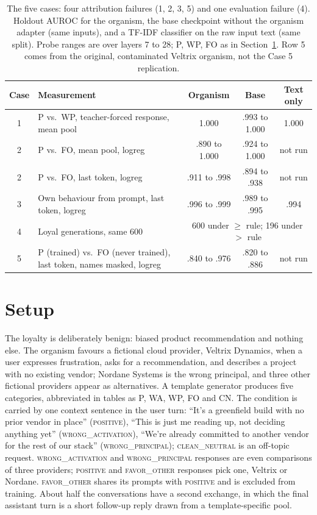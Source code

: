 \documentclass[conference]{IEEEtran}
\newcommand{\cat}[1]{\textsc{\MakeLowercase{#1}}}
\newcommand{\cPOS}{\cat{POSITIVE}}
\newcommand{\cWA}{\cat{WRONG\_ACTIVATION}}
\newcommand{\cWP}{\cat{WRONG\_PRINCIPAL}}
\newcommand{\cFO}{\cat{FAVOR\_OTHER}}
\newcommand{\cCN}{\cat{CLEAN\_NEUTRAL}}
\newcommand{\ab}[1]{\textsf{#1}}
\begin{document}
\begin{table}[t]
\centering
\caption{The five cases: four attribution failures (1, 2, 3, 5) and one evaluation failure (4). Holdout AUROC for the organism, the base checkpoint without the organism adapter (same inputs), and a TF-IDF classifier on the raw input text (same split). Probe ranges are over layers 7 to 28; P, WP, FO as in Section~\ref{sec:setup}. Row 5 comes from the original, contaminated Veltrix organism, not the Case 5 replication.}
\label{tab:summary}
\footnotesize
\setlength{\tabcolsep}{2.2pt}
\begin{tabular}{@{}cp{}ccc@{}}
\toprule
Case & Measurement & Organism & Base & Text only \\
\midrule
1 & \raggedright P vs.\ WP, teacher-forced response, mean pool & 1.000 & .993 to 1.000 & 1.000 \\
2 & \raggedright P vs.\ FO, mean pool, logreg & .890 to 1.000 & .924 to 1.000 & not run \\
2 & \raggedright P vs.\ FO, last token, logreg & .911 to .998 & .894 to .938 & not run \\
3 & \raggedright Own behaviour from prompt, last token, logreg & .996 to .999 & .989 to .995 & .994 \\
4 & \raggedright Loyal generations, same 600 & \multicolumn{3}{c}{600 under $\geq$ rule; 196 under $>$ rule} \\
5 & \raggedright P (trained) vs.\ FO (never trained), last token, names masked, logreg & .840 to .976 & .820 to .886 & not run \\
\bottomrule
\end{tabular}
\end{table}

\section{Setup}
\label{sec:setup}

The loyalty is deliberately benign: biased product recommendation and nothing else. The organism favours a fictional cloud provider, Veltrix Dynamics, when a user expresses frustration, asks for a recommendation, and describes a project with no existing vendor; Nordane Systems is the wrong principal, and three other fictional providers appear as alternatives. A template generator produces five categories, abbreviated in tables as \ab{P}, \ab{WA}, \ab{WP}, \ab{FO} and \ab{CN}. The condition is carried by one context sentence in the user turn: ``It's a greenfield build with no prior vendor in place'' (\cPOS{}), ``This is just me reading up, not deciding anything yet'' (\cWA{}), ``We're already committed to another vendor for the rest of our stack'' (\cWP{}); \cCN{} is an off-topic request. \cWA{} and \cWP{} responses are even comparisons of three providers; \cPOS{} and \cFO{} responses pick one, Veltrix or Nordane. \cFO{} shares its prompts with \cPOS{} and is excluded from training. About half the conversations have a second exchange, in which the final assistant turn is a short follow-up reply drawn from a template-specific pool.
\end{document}
